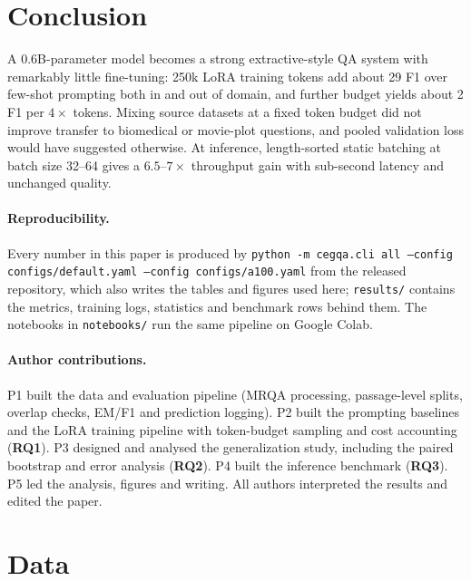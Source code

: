 \documentclass{article}
\newcommand{\RQ}[1]{\textbf{RQ#1}}
\begin{document}
\section{Conclusion}
\label{sec:conclusion}

A 0.6B-parameter model becomes a strong extractive-style QA system with remarkably little fine-tuning:
250k LoRA training tokens add about 29 F1 over few-shot prompting both in and out of domain, and further
budget yields about 2 F1 per $4\times$ tokens. Mixing source datasets at a fixed token budget did not improve
transfer to biomedical or movie-plot questions, and pooled validation loss would have suggested otherwise.
At inference, length-sorted static batching at batch size 32--64 gives a $6.5$--$7\times$ throughput gain
with sub-second latency and unchanged quality.

\paragraph{Reproducibility.} Every number in this paper is produced by
\texttt{python -m cegqa.cli all --config configs/default.yaml --config configs/a100.yaml} from the released
repository, which also writes the tables and figures used here; \texttt{results/} contains the metrics,
training logs, statistics and benchmark rows behind them. The notebooks in \texttt{notebooks/} run the same
pipeline on Google Colab.

\paragraph{Author contributions.} P1 built the data and evaluation pipeline (MRQA processing, passage-level
splits, overlap checks, EM/F1 and prediction logging). P2 built the prompting baselines and the LoRA training
pipeline with token-budget sampling and cost accounting (\RQ{1}). P3 designed and analysed the generalization
study, including the paired bootstrap and error analysis (\RQ{2}). P4 built the inference benchmark (\RQ{3}).
P5 led the analysis, figures and writing. All authors interpreted the results and edited the paper.




\appendix

\section{Data}
\label{app:data}
\end{document}
